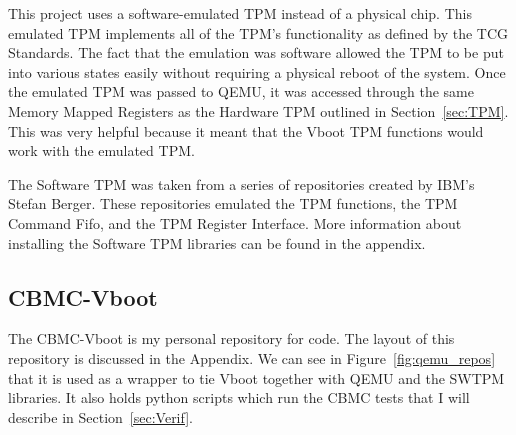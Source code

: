 This project uses a software-emulated TPM instead of a physical chip. 
This emulated TPM implements all of the TPM's functionality as defined by the
TCG Standards.
The fact that the emulation was software allowed the TPM to be put into various
states easily without requiring a physical reboot of the system.
Once the emulated TPM was passed to QEMU, it was accessed through the same
Memory Mapped Registers as the Hardware TPM outlined in Section~\ref{sec:TPM}.
This was very helpful because it meant that the Vboot TPM functions would work
with the emulated TPM.

The Software TPM was taken from a series of repositories created by IBM's
Stefan Berger. 
These repositories emulated the TPM functions\cite{TPMLibs}, the TPM Command
Fifo\cite{SWTPM}, and the TPM Register Interface\cite{TPMQEMU}. 
More information about installing the Software TPM libraries can be found in the
appendix.

\subsection{CBMC-Vboot}

The CBMC-Vboot is my personal repository for code\cite{my-repo}.
The layout of this repository is discussed in the Appendix.
We can see in Figure~\ref{fig:qemu_repos} that it is used as a wrapper to tie
Vboot together with QEMU and the SWTPM libraries.
It also holds python scripts which run the CBMC tests that I will describe in
Section~\ref{sec:Verif}.

